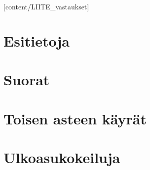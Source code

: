 [content/LIITE_vastaukset]

\chapter{Esitietoja}
	
	\newpage 
	\newpage 
	\newpage 

\chapter{Suorat}
	
	\newpage 
	\newpage 
	\newpage 

\chapter{Toisen asteen käyrät}
	
	\newpage 
	\newpage 
	\newpage 
	\newpage 
	\newpage 
	\newpage 

\chapter{Ulkoasukokeiluja}
	\newpage 

